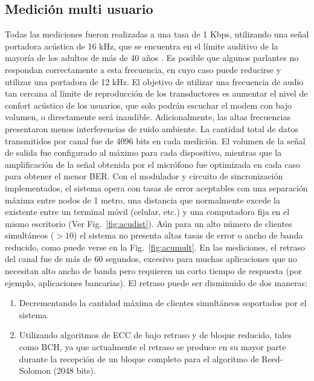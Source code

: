 \subsection{Medición multi usuario}

Todas las mediciones fueron realizadas a una tasa de 1 Kbps, utilizando una señal portadora acústica de 16 kHz, que se encuentra en el límite auditivo de la mayoría de los adultos de más de 40 años \cite{gordon2005hearing}. Es posible que algunos parlantes no respondan correctamente a esta frecuencia, en cuyo caso puede reducirse y utilizar una portadora de 12 kHz. El objetivo de utilizar una frecuencia de audio tan cercana al límite de reproducción de los transductores es aumentar el nivel de confort acústico de los usuarios, que solo podrán escuchar el modem con bajo volumen, o directamente será inaudible. Adicionalmente, las altas frecuencias presentaron menos interferencias de ruido ambiente.
La cantidad total de datos transmitidos por canal fue de 4096 bits en cada medición. El volumen de la señal de salida fue configurado al máximo para cada dispositivo, mientras que la amplificación de la señal obtenida por el micrófono fue optimizada en cada caso para obtener el menor BER.
Con el modulador y circuito de sincronización implementados, el sistema opera con tasas de error aceptables con una separación máxima entre nodos de 1 metro, una distancia que normalmente excede la existente entre un terminal móvil (celular, etc.) y una computadora fija en el mismo escritorio (Ver Fig.~\ref{fig:acudist}). Aún para un alto número de clientes simultáneos ($> 10$) el sistema no presenta altas tasas de error o ancho de banda reducido, como puede verse en la Fig.~\ref{fig:acumult}.
En las mediciones, el retraso del canal fue de más de 60 segundos, excesivo para muchas aplicaciones que no necesitan alto ancho de banda pero requieren un corto tiempo de respuesta (por ejemplo, aplicaciones bancarias). El retraso puede ser disminuido de dos maneras: 
\begin{enumerate}
 \item Decrementando la cantidad máxima de clientes simultáneos soportados por el sistema.
 \item Utilizando algoritmos de ECC de bajo retraso y de bloque reducido, tales como BCH, ya que actualmente el retraso se produce en su mayor parte durante la recepción de un bloque completo para el algoritmo de Reed-Solomon (2048 bits).
\end{enumerate}

